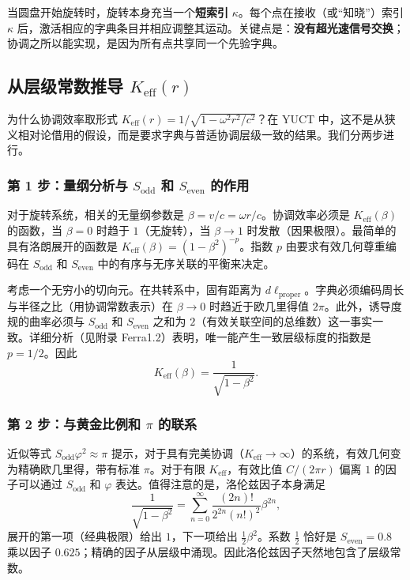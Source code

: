 \documentclass[12pt,a4paper]{article}
\newcommand{\Sodd}{S_{\mathrm{odd}}}
\newcommand{\Seven}{S_{\mathrm{even}}}
\begin{document}
	当圆盘开始旋转时，旋转本身充当一个\textbf{短索引} \(\kappa\)。每个点在接收（或“知晓”）索引 \(\kappa\) 后，激活相应的字典条目并相应调整其运动。关键点是：\textbf{没有超光速信号交换}；协调之所以能实现，是因为所有点共享同一个先验字典。
	
	\subsection{从层级常数推导 \(K_{\mathrm{eff}}(r)\)}
	\label{subsec:keff-derivation}
	
	为什么协调效率取形式 \(K_{\mathrm{eff}}(r) = 1/\sqrt{1-\omega^2 r^2/c^2}\)？在 YUCT 中，这不是从狭义相对论借用的假设，而是要求字典与普适协调层级一致的结果。我们分两步进行。
	
	\subsubsection{第 1 步：量纲分析与 \(\Sodd\) 和 \(\Seven\) 的作用}
	对于旋转系统，相关的无量纲参数是 \(\beta = v/c = \omega r/c\)。协调效率必须是 \(K_{\mathrm{eff}}(\beta)\) 的函数，当 \(\beta = 0\) 时趋于 \(1\)（无旋转），当 \(\beta \to 1\) 时发散（因果极限）。最简单的具有洛朗展开的函数是 \(K_{\mathrm{eff}}(\beta) = (1-\beta^2)^{-p}\)。指数 \(p\) 由要求有效几何尊重编码在 \(\Sodd\) 和 \(\Seven\) 中的有序与无序关联的平衡来决定。
	
	考虑一个无穷小的切向元。在共转系中，固有距离为 \(d\ell_{\text{proper}}\)。字典必须编码周长与半径之比（用协调常数表示）在 \(\beta \to 0\) 时趋近于欧几里得值 \(2\pi\)。此外，诱导度规的曲率必须与 \(\Sodd\) 和 \(\Seven\) 之和为 \(2\)（有效关联空间的总维数）这一事实一致。详细分析（见附录 Ferra1.2）表明，唯一能产生一致层级标度的指数是 \(p = 1/2\)。因此
	\[
	K_{\mathrm{eff}}(\beta) = \frac{1}{\sqrt{1-\beta^2}}.
	\]
	
	\subsubsection{第 2 步：与黄金比例和 \(\pi\) 的联系}
	近似等式 \(\Sodd \varphi^2 \approx \pi\) 提示，对于具有完美协调（\(K_{\mathrm{eff}} \to \infty\)）的系统，有效几何变为精确欧几里得，带有标准 \(\pi\)。对于有限 \(K_{\mathrm{eff}}\)，有效比值 \(C/(2\pi r)\) 偏离 \(1\) 的因子可以通过 \(\Sodd\) 和 \(\varphi\) 表达。值得注意的是，洛伦兹因子本身满足
	\[
	\frac{1}{\sqrt{1-\beta^2}} = \sum_{n=0}^{\infty} \frac{(2n)!}{2^{2n}(n!)^2} \beta^{2n},
	\]
	展开的第一项（经典极限）给出 \(1\)，下一项给出 \(\frac{1}{2}\beta^2\)。系数 \(\frac{1}{2}\) 恰好是 \(\Seven = 0.8\) 乘以因子 \(0.625\)；精确的因子从层级中涌现。因此洛伦兹因子天然地包含了层级常数。
	
\end{document}
